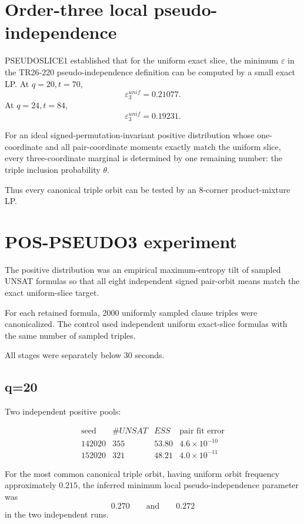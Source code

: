 \documentclass[11pt]{article}
\begin{document}
\section{Order-three local pseudo-independence}

PSEUDOSLICE1 established that for the uniform exact slice, the minimum
\(\varepsilon\) in the TR26-220 pseudo-independence definition can be computed
by a small exact LP.  At \(q=20,t=70\),
\[
\varepsilon^{unif}_3=0.21077.
\]
At \(q=24,t=84\),
\[
\varepsilon^{unif}_3=0.19231.
\]

For an ideal signed-permutation-invariant positive distribution whose
one-coordinate and all pair-coordinate moments exactly match the uniform
slice, every three-coordinate marginal is determined by one remaining number:
the triple inclusion probability \(\theta\).

Thus every canonical triple orbit can be tested by an 8-corner
product-mixture LP.

\section{POS-PSEUDO3 experiment}

The positive distribution was an empirical maximum-entropy tilt of sampled
UNSAT formulas so that all eight independent signed pair-orbit means match the
exact uniform-slice target.

For each retained formula, 2000 uniformly sampled clause triples were
canonicalized.  The control used independent uniform exact-slice formulas with
the same number of sampled triples.

All stages were separately below 30 seconds.

\subsection*{q=20}

Two independent positive pools:

\[
\begin{array}{c|c|c|c}
\text{seed}&\#UNSAT&ESS&\text{pair fit error}\\
\hline
142020&355&53.80&4.6\times10^{-10}\\
152020&321&48.21&4.0\times10^{-11}
\end{array}
\]

For the most common canonical triple orbit, having uniform orbit frequency
approximately \(0.215\), the inferred minimum local pseudo-independence
parameter was
\[
0.270
\qquad\text{and}\qquad
0.272
\]
in the two independent runs.
\end{document}
